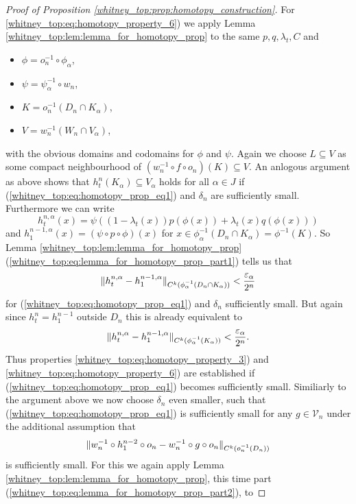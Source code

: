 \begin{proof}[Proof of Proposition \ref{whitney_top:prop:homotopy_construction}]
    For \ref{whitney_top:eq:homotopy_property_6}) we apply Lemma \ref{whitney_top:lem:lemma_for_homotopy_prop} to the same $p,q, \lambda_t, C$ and 
    \begin{itemize}
        \item $\phi = o_n^{-1} \circ \phi_\alpha$,
        \item $\psi = \psi_\alpha^{-1} \circ w_n$,
        \item $K = o_n^{-1}(D_n \cap K_\alpha)$,
        \item $V = w_n^{-1}(W_n \cap V_\alpha)$,
    \end{itemize}
    with the obvious domains and codomains for $\phi$ and $\psi$. Again we choose $L \subseteq V$ as some compact neighbourhood of $(w_n^{-1} \circ f \circ o_n)(K) \subseteq V$. An anlogous argument as above shows that $h_t^{n}(K_\alpha) \subseteq V_\alpha$ holds for all $\alpha \in J$ if (\ref{whitney_top:eq:homotopy_prop_eq1}) and $\delta_n$ are sufficiently small. Furthermore we can write 
    \[
    h_t^{n,\alpha}(x) = \psi((1-\lambda_t(x)) p (\phi(x)) + \lambda_t(x) q(\phi(x)))
    \]
    and $h_1^{n-1,\alpha}(x) = (\psi \circ p \circ \phi)(x)$ for $x \in \phi_\alpha^{-1}(D_n \cap K_\alpha) = \phi^{-1}(K)$. So Lemma \ref{whitney_top:lem:lemma_for_homotopy_prop} (\ref{whitney_top:eq:lemma_for_homotopy_prop_part1}) tells us that 
    \[
        \lVert h_t^{n,\alpha} - h_1^{n-1,\alpha}\rVert_{C^k(\phi_\alpha^{-1}(D_n \cap K_\alpha))} < \frac{\varepsilon_\alpha}{2^n}
    \]
    for (\ref{whitney_top:eq:homotopy_prop_eq1}) and $\delta_n$ sufficiently small. But again since $h_t^{n} = h_1^{n-1}$ outside $D_n$ this is already equivalent to 
    \[
        \lVert h_t^{n,\alpha} - h_1^{n-1,\alpha}\rVert_{C^k(\phi_\alpha^{-1}(K_\alpha))} < \frac{\varepsilon_\alpha}{2^n}.
    \]
    Thus properties \ref{whitney_top:eq:homotopy_property_3}) and \ref{whitney_top:eq:homotopy_property_6}) are established if (\ref{whitney_top:eq:homotopy_prop_eq1}) becomes sufficiently small. Similiarly to the argument above we now choose $\delta_n$ even smaller, such that (\ref{whitney_top:eq:homotopy_prop_eq1}) is sufficiently small for any $g \in \mathcal{V}_n$ under the additional assumption that 
    \begin{equation}
        \label{whitney_top:eq:homotopy_prop_eq2}
    \lVert w_n^{-1} \circ h_1^{n-2} \circ o_n - w_n^{-1} \circ g \circ o_n\rVert_{C^k(o_n^{-1}(D_n))}
    \end{equation}
    is sufficiently small. For this we again apply Lemma \ref{whitney_top:lem:lemma_for_homotopy_prop}, this time part (\ref{whitney_top:eq:lemma_for_homotopy_prop_part2}), to 

\end{proof}
